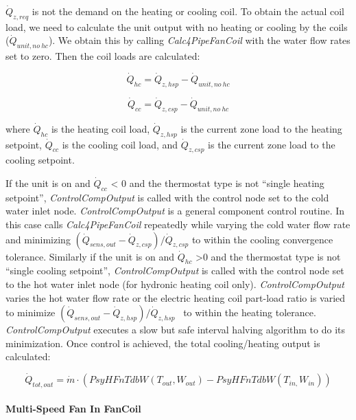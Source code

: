 \({\dot Q_{z,req}}\) is not the demand on the heating or cooling coil. To obtain the actual coil load, we need to calculate the unit output with no heating or cooling by the coils (\({\dot Q_{unit,no~hc}}\)). We obtain this by calling \emph{Calc4PipeFanCoil} with the water flow rates set to zero. Then the coil loads are calculated:

\begin{equation}
{\dot Q_{hc}} = {\dot Q_{z,hsp}} - {\dot Q_{unit,no~hc}}
\end{equation}

\begin{equation}
{\dot Q_{cc}} = {\dot Q_{z,csp}} - {\dot Q_{unit,no~hc}}
\end{equation}

where \({\dot Q_{hc}}\) is the heating coil load, \({\dot Q_{z,hsp}}\) is the current zone load to the heating setpoint, \({\dot Q_{cc}}\) is the cooling coil load, and \({\dot Q_{z,csp}}\) is the current zone load to the cooling setpoint.

If the unit is on and \({\dot Q_{cc}}\) \textless{} 0 and the thermostat type is not ``single heating setpoint'', \emph{ControlCompOutput} is called with the control node set to the cold water inlet node. \emph{ControlCompOutput} is a general component control routine. In this case calls \emph{Calc4PipeFanCoil} repeatedly while varying the cold water flow rate and minimizing \(({\dot Q_{sens,out}} - {\dot Q_{z,csp}})/{\dot Q_{z,csp}}\) to within the cooling convergence tolerance. Similarly if the unit is on and \({\dot Q_{hc}}\) \textgreater{}0 and the thermostat type is not ``single cooling setpoint'', \emph{ControlCompOutput} is called with the control node set to the hot water inlet node (for hydronic heating coil only). \emph{ControlCompOutput} varies the hot water flow rate or the electric heating coil part-load ratio is varied to minimize \(({\dot Q_{sens,out}} - {\dot Q_{z,hsp}})/{\dot Q_{z,hsp}}\) ~to within the heating tolerance. \emph{ControlCompOutput} executes a slow but safe interval halving algorithm to do its minimization. Once control is achieved, the total cooling/heating output is calculated:

\begin{equation}
{\dot Q_{tot,out}} = \dot m\cdot ({PsyHFnTdbW}({T_{out}},{W_{out}}) - {PsyHFnTdbW}({T_{in,}}{W_{in}}))
\end{equation}

\paragraph{Multi-Speed Fan In FanCoil}\label{multi-speed-fan-in-fancoil}

